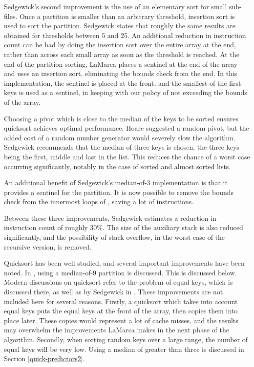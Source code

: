 Sedgewick's second improvement is the use of an elementary sort for small
sub-files.  Once a partition is smaller than an arbitrary threshold, insertion
sort is used to sort the partition. Sedgewick states that roughly the same
results are obtained for thresholds between 5 and 25. An additional reduction in
instruction count can be had by doing the insertion sort over the entire array
at the end, rather than across each small array as soon as the threshold is
reached. At the end of the partition sorting, LaMarca places a sentinel at the
end of the array and uses an insertion sort, eliminating the bounds check from
the end. In this implementation, the sentinel is placed at the front, and the
smallest of the first  keys is used as a sentinel, in keeping
with our policy of not exceeding the bounds of the array.

Choosing a pivot which is close to the median of the keys to be sorted ensures
quicksort achieves optimal performance. Hoare suggested a random pivot, but the
added cost of a random number generator would severely slow the algorithm.
Sedgewick recommends that the median of three keys is chosen, the three keys
being the first, middle and last in the list. This reduces the chance of a worst
case occurring significantly, notably in the case of sorted and almost sorted
lists. 

An additional benefit of Sedgewick's median-of-3 implementation is that it
provides a sentinel for the partition. It is now possible to remove the bounds
check from the innermost loops of , saving a lot of instructions.

Between these three improvements, Sedgewick estimates a reduction in
instruction count of roughly 30\%. The size of the auxiliary stack is also
reduced significantly, and the possibility of stack overflow, in the worst case
of the recursive version, is removed.

Quicksort has been well studied, and several important improvements have been
noted. In \cite{BentleyMcIlroy93}, using a median-of-9 partition is discussed.
This is discussed below. Modern discussions on quicksort refer to the problem of
equal keys, which is discussed there, as well as by Sedgewick in
\cite{SedgewickBentley02}. These improvements are not included here for several
reasons. Firstly, a quicksort which takes into account equal keys puts the equal
keys at the front of the array, then copies them into place later. These copies
would represent a lot of cache misses, and the results may overwhelm the
improvements LaMarca makes in the next phase of the algorithm. Secondly, when
sorting random keys over a large range, the number of equal keys will be very
low. Using a median of greater than three is discussed in Section
\ref{quick-predictors2}.

